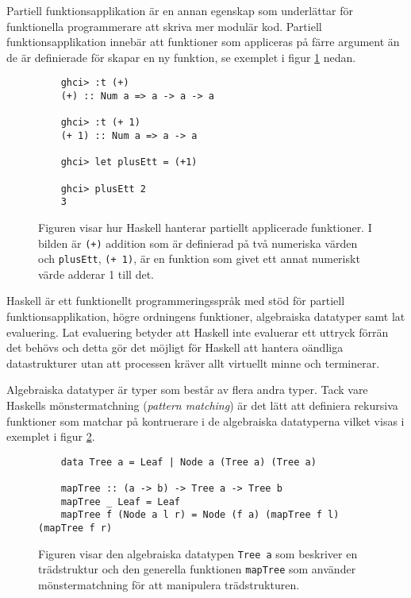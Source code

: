\documentclass[12pt,a4paper,twoside,openright]{article}
\begin{document}
Partiell funktionsapplikation är en annan egenskap som underlättar för
funktionella programmerare att skriva mer modulär kod. Partiell
funktionsapplikation innebär att funktioner som appliceras på färre
argument än de är definierade för skapar en ny funktion, se exemplet i
figur \ref{fig:hask_partfunapp} nedan.

\begin{figure}[H]
  \begin{verbatim}
    ghci> :t (+)
    (+) :: Num a => a -> a -> a

    ghci> :t (+ 1)
    (+ 1) :: Num a => a -> a

    ghci> let plusEtt = (+1)

    ghci> plusEtt 2
    3
  \end{verbatim}
  \caption{Figuren visar hur Haskell hanterar partiellt applicerade
    funktioner. I bilden är \texttt{(+)} addition som är
    definierad på två numeriska värden och
    \texttt{plusEtt}, \texttt{(+ 1)}, är en
    funktion som givet ett annat numeriskt värde adderar 1 till det.}
  \label{fig:hask_partfunapp}
\end{figure}

Haskell är ett funktionellt programmeringsspråk med stöd för partiell
funktionsapplikation, högre ordningens funktioner, algebraiska
datatyper samt lat evaluering. Lat evaluering betyder att Haskell inte
evaluerar ett uttryck förrän det behövs och detta gör det möjligt för
Haskell att hantera oändliga datastrukturer utan att processen kräver
allt virtuellt minne och terminerar.

Algebraiska datatyper är typer som består av flera andra typer. Tack
vare Haskells mönstermatchning (\textit{pattern matching}) är det lätt
att definiera rekursiva funktioner som matchar på kontruerare i de
algebraiska datatyperna vilket visas i exemplet i figur
\ref{fig:hask_alg_type}.

\begin{figure}[H]
  \begin{verbatim}
    data Tree a = Leaf | Node a (Tree a) (Tree a)

    mapTree :: (a -> b) -> Tree a -> Tree b
    mapTree _ Leaf = Leaf
    mapTree f (Node a l r) = Node (f a) (mapTree f l) (mapTree f r)
  \end{verbatim}
  \caption{Figuren visar den algebraiska datatypen
    \texttt{Tree a} som beskriver en trädstruktur och den
    generella funktionen \texttt{mapTree} som använder
    mönstermatchning för att manipulera trädstrukturen.}
  \label{fig:hask_alg_type}
\end{figure}
\end{document}
